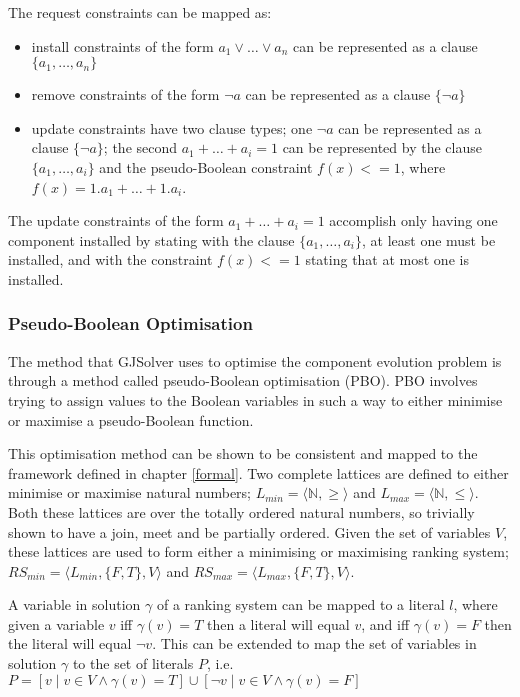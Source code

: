 The request constraints can be mapped as:
\begin{itemize}
      \item install constraints of the form $a_1 \vee \ldots \vee a_n$  can be represented as a clause $\{a_1,\ldots,a_n\}$
      \item remove constraints of the form $\neg a$ can be represented as a clause $\{\neg a\}$
      \item update constraints have two clause types; one $\neg a$ can be represented as a clause $\{\neg a\}$;
      the second $a_1 + \ldots + a_i = 1$ can be represented by the clause $\{a_1,\ldots,a_i\}$ 
      and the pseudo-Boolean constraint $f(x) <= 1$, where $f(x) = 1.a_1 + \ldots + 1.a_i$.
\end{itemize}

The update constraints of the form $a_1 + \ldots + a_i = 1$ accomplish only having one component installed by stating with the clause $\{a_1,\ldots,a_i\}$, at least one must be installed,
and with the constraint $f(x) <=1$ stating that at most one is installed.

\subsubsection{Pseudo-Boolean Optimisation}
The method that GJSolver uses to optimise the component evolution problem is through a method called pseudo-Boolean optimisation (PBO).
PBO involves trying to assign values to the Boolean variables in such a way to either minimise or maximise a pseudo-Boolean function.

This optimisation method can be shown to be consistent and mapped to the framework defined in chapter \ref{formal}.
Two complete lattices are defined to either minimise or maximise natural numbers; $L_{min} = \langle \mathbb{N}, \geq \rangle$ and $L_{max} = \langle \mathbb{N}, \leq \rangle$.
Both these lattices are over the totally ordered natural numbers, so trivially shown to have a join, meet and be partially ordered.
Given the set of variables $V$, these lattices are used to form either a minimising or maximising  ranking system;
$RS_{min} = \langle L_{min}, \{F,T\}, V \rangle$ and $RS_{max} = \langle L_{max}, \{F,T\}, V \rangle$. 

A variable in solution $\gamma$ of a ranking system can be mapped to a literal $l$,
where given a variable $v$ iff $\gamma(v) = T$ then a literal will equal $v$, and iff $\gamma(v) = F$ then the literal will equal $\neg v$.
This can be extended to map the set of variables in solution $\gamma$ to the set of literals $P$, i.e. $P = [v \mid v \in V \wedge \gamma(v) = T] \cup [\neg v \mid v \in V \wedge \gamma(v) = F]$

